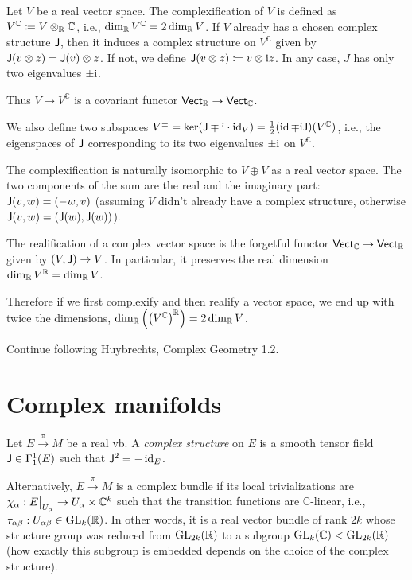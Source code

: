 \begin{defn}[Complexification]\label{def complexification}
    Let $V$ be a real vector space. The complexification of $V$ is defined as $V^\mathbb{C}\coloneqq V\otimes_{\mathbb{R}} \mathbb{C}$, i.e., $\dim_{\mathbb{R}} V^\mathbb{C}=2\dim_{\mathbb{R}} V$. If $V$ already has a chosen complex structure $\mathsf{J}$, then it induces a complex structure on $V^\mathbb{C}$ given by $\mathsf{J}(v\otimes z)=\mathsf{J}(v)\otimes z$. If not, we define $\mathsf{J}(v\otimes z)\coloneqq v\otimes \mathrm{i} z$. In any case, $J$ has only two eigenvalues $\pm \mathrm{i}$.
    
    Thus $V\mapsto V^{\mathbb{C}}$ is a covariant functor $\mathsf{Vect}_{\mathbb{R}} \to \mathsf{Vect}_\mathbb{C}$.
    
    We also define two subspaces $V^\pm=\ker(\mathsf{J}\mp \mathrm{i}\cdot\operatorname{id}_V)=\frac12(\operatorname{id}\mp \mathrm{i} \mathsf{J})(V^\mathbb{C})$, i.e., the eigenspaces of $\mathsf{J}$ corresponding to its two eigenvalues $\pm \mathrm{i}$ on $V^\mathbb{C}$.
\end{defn}

The complexification is naturally isomorphic to $V\oplus V$ as a real vector space. The two components of the sum are the real and the imaginary part: $\mathsf{J}(v,w)=(-w,v)$ (assuming $V$ didn't already have a complex structure, otherwise $\mathsf{J}(v,w)=(\mathsf{J}(w),\mathsf{J}(w))$).


\begin{defn}[Realification]
    The realification of a complex vector space is the forgetful functor $\mathsf{Vect}_\mathbb{C}\to\mathsf{Vect}_{\mathbb{R}} $ given by $(V,\mathsf{J})\to V$. In particular, it preserves the real dimension $\dim_{\mathbb{R}} V^{\mathbb{R}} =\dim_{\mathbb{R}} V$.
\end{defn}

Therefore if we first complexify and then realify a vector space, we end up with twice the dimensions, $\dim_{\mathbb{R}} \left(\left(V^\mathbb{C}\right)^{\mathbb{R}} \right)=2\dim_{\mathbb{R}} V$.


Continue following Huybrechts, Complex Geometry 1.2.







\section{Complex manifolds}

\begin{defn}
    Let $E\overset\pi\to M$ be a real \gls{vb}. A \emph{complex structure} on $E$ is a smooth tensor field $\mathsf{J}\in\Gamma^1_1(E)$ such that $\mathsf{J}^2=-\operatorname{id}_E$.
    
    Alternatively, $E\overset\pi\to M$ is a complex bundle if its local trivializations are $\chi_\alpha:\restr{E}{U_\alpha}\to U_\alpha\times \mathbb{C}^k$ such that the transition functions are $\mathbb{C}$-linear, i.e., $\tau_{\alpha\beta}:U_{\alpha\beta}\in \operatorname{GL}_k(\mathbb{R} )$. In other words, it is a real vector bundle of rank $2k$ whose structure group was reduced from $\operatorname{GL}_{2k}(\mathbb{R} )$ to a subgroup $\operatorname{GL}_k(\mathbb{C})<\operatorname{GL}_{2k}(\mathbb{R} )$ (how exactly this subgroup is embedded depends on the choice of the complex structure).
\end{defn}


